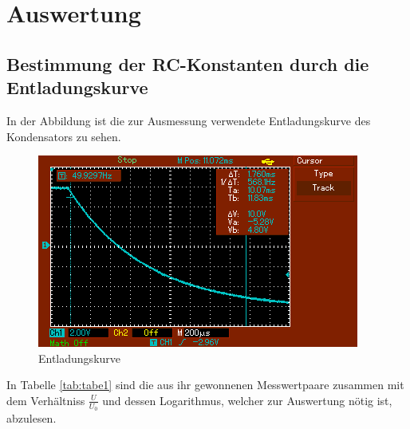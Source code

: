 \section{Auswertung}
\subsection{Bestimmung der RC-Konstanten durch die Entladungskurve}
In der Abbildung %
ist die zur Ausmessung verwendete Entladungskurve des Kondensators zu sehen.
\begin{figure}[H]
  \centering
  \includegraphics{kurve}
  \caption{Entladungskurve}
  \label{fig:kurve}
\end{figure}
In Tabelle \ref{tab:tabe1} sind die aus ihr gewonnenen Messwertpaare zusammen mit
dem Verhältniss $ \frac{U}{U_0} $ und dessen Logarithmus, welcher zur
Auswertung nötig ist, abzulesen.

